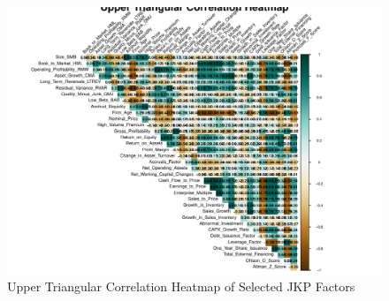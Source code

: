 \documentclass[t]{beamer}\usepackage[]{graphicx}\usepackage[table]{xcolor}
\makeatletter
\def\maxwidth{ %
  \ifdim\Gin@nat@width>\linewidth
    \linewidth
  \else
    \Gin@nat@width
  \fi
}
\newenvironment{knitrout}{}{} %
\makeatother
\begin{document}
\begin{frame}
\begin{knitrout}
\color{fgcolor}\begin{figure}

{\centering \includegraphics[width=\maxwidth]{figure/corr_heatmap-1} 

}

\caption[Upper Triangular Correlation Heatmap of Selected JKP Factors]{Upper Triangular Correlation Heatmap of Selected JKP Factors}\label{fig:corr_heatmap}
\end{figure}

\end{knitrout}

\end{frame}
\end{document}
